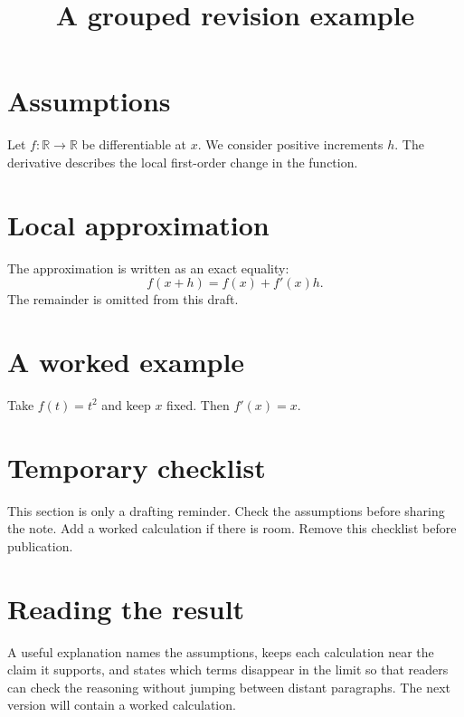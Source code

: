 \documentclass{article}
\title{A grouped revision example}
\author{}
\date{}
\begin{document}
\maketitle

\section{Assumptions}
Let \(f:\mathbb R\to\mathbb R\) be differentiable at \(x\).
We consider positive increments \(h\).
The derivative describes the local first-order change in the function.

\section{Local approximation}
The approximation is written as an exact equality:
\[
  f(x+h)=f(x)+f'(x)h.
\]
The remainder is omitted from this draft.

\section{A worked example}
Take \(f(t)=t^2\) and keep \(x\) fixed.
Then \(f'(x)=x\).

\section{Temporary checklist}
This section is only a drafting reminder.
Check the assumptions before sharing the note.
Add a worked calculation if there is room.
Remove this checklist before publication.

\section{Reading the result}
A useful explanation names the assumptions, keeps each calculation near the claim it supports, and states which terms disappear in the limit so that readers can check the reasoning without jumping between distant paragraphs.
The next version will contain a worked calculation.
\end{document}
